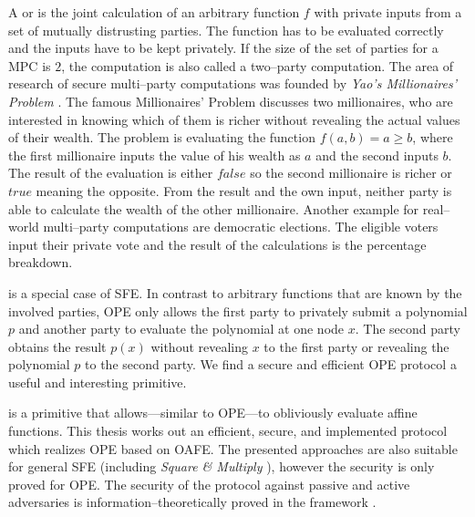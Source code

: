 \label{sec:introduction}

A  or  is the joint calculation of an arbitrary function $f$ with
private inputs from a set of mutually distrusting parties. The function has to
be evaluated correctly and the inputs have to be kept privately.  If the size
of the set of parties for a MPC is $2$, the computation is also called a
two--party computation. The area of research of secure multi--party computations
was founded by \emph{Yao's Millionaires' Problem} \cite{yao82}. The famous
Millionaires' Problem discusses two millionaires, who are interested in knowing
which of them is richer without revealing the actual values of their wealth. The
problem is evaluating the function $f(a, b) = a \geq b$, where the first
millionaire inputs the value of his wealth as $a$ and the second inputs $b$. The
result of the evaluation is either $false$ so the second millionaire is richer
or $true$ meaning the opposite. From the result and the own input, neither party
is able to calculate the wealth of the other millionaire. Another example for
real--world multi--party computations are democratic elections. The eligible
voters input their private vote and the result of the calculations is the
percentage breakdown.

 \cite{naor99,naor06} is a special
case of SFE. In contrast to arbitrary functions that are known by the involved
parties, OPE only allows the first party to privately submit a polynomial $p$
and another party to evaluate the polynomial at one node $x$. The second party
obtains the result $p(x)$ without revealing $x$ to the first party or revealing
the polynomial $p$ to the second party. We find a secure and efficient OPE
protocol a useful and interesting primitive.

 \cite{davidgoliath} is a
primitive that allows---similar to OPE---to obliviously evaluate affine
functions. This thesis works out an efficient, secure, and implemented protocol
which realizes OPE based on OAFE. The presented approaches are also suitable for
general SFE (including \emph{Square \& Multiply} \cite{knuth81}), however the
security is only proved for OPE. The security of the protocol against passive
and active adversaries is in\-for\-ma\-tion--the\-o\-ret\-ically proved in the
 framework \cite{canetti05}.


%
%
\label{sec:related-work}

